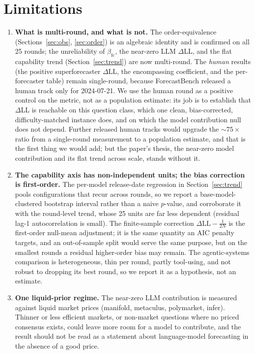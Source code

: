 \documentclass[11pt]{article}
\begin{document}
\section{Limitations}
\label{sec:limits}
\begin{enumerate}[leftmargin=1.4em,itemsep=2pt]
\item \textbf{What is multi-round, and what is not.} The order-equivalence (Sections~\ref{sec:obs}, \ref{sec:order}) is an algebraic identity and is confirmed on all 25 rounds; the unreliability of $\beta_{\mathrm{fc}}$, the near-zero LLM $\Delta$LL, and the flat capability trend (Section~\ref{sec:trend}) are now multi-round. The \emph{human} results (the positive superforecaster $\Delta$LL, the encompassing coefficient, and the per-forecaster table) remain single-round, because ForecastBench released a human track only for 2024-07-21. We use the human round as a positive control on the metric, not as a population estimate: its job is to establish that $\Delta$LL is reachable on this question class, which one clean, bias-corrected, difficulty-matched instance does, and on which the model contribution null does not depend. Further released human tracks would upgrade the $\sim\!75\times$ ratio from a single-round measurement to a population estimate, and that is the first thing we would add; but the paper's thesis, the near-zero model contribution and its flat trend across scale, stands without it.
\item \textbf{The capability axis has non-independent units; the bias correction is first-order.} The per-model release-date regression in Section~\ref{sec:trend} pools configurations that recur across rounds, so we report a base-model-clustered bootstrap interval rather than a naive $p$-value, and corroborate it with the round-level trend, whose 25 units are far less dependent (residual lag-1 autocorrelation is small). The finite-sample correction $\Delta\mathrm{LL}-\tfrac1{2N}$ is the first-order null-mean adjustment; it is the same quantity an AIC penalty targets, and an out-of-sample split would serve the same purpose, but on the smallest rounds a residual higher-order bias may remain. The agentic-systems comparison is heterogeneous, thin per round, partly tool-using, and not robust to dropping its best round, so we report it as a hypothesis, not an estimate.
\item \textbf{One liquid-prior regime.} The near-zero LLM contribution is measured against liquid market prices (manifold, metaculus, polymarket, infer). Thinner or less efficient markets, or non-market questions where no priced consensus exists, could leave more room for a model to contribute, and the result should not be read as a statement about language-model forecasting in the absence of a good price.

\end{enumerate}
\end{document}
